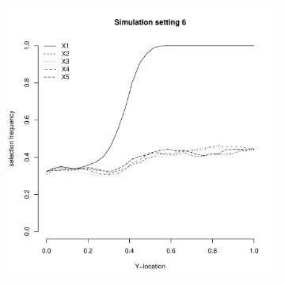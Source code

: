\documentclass[authoryear, review, 11pt]{elsarticle}
\begin{document}
\begin{figure}
\begin{subfigure}[b]{0.3\textwidth}
			\label{fig:tiger}
		\end{subfigure}
        ~ %
		\begin{subfigure}[b]{0.3\textwidth}
			\centering
			\includegraphics[width=\textwidth]{../../figures/simulation/28-6-profile-selection.pdf}
			\label{fig:mouse}
		\end{subfigure}
	\end{figure}
	
\end{document}
